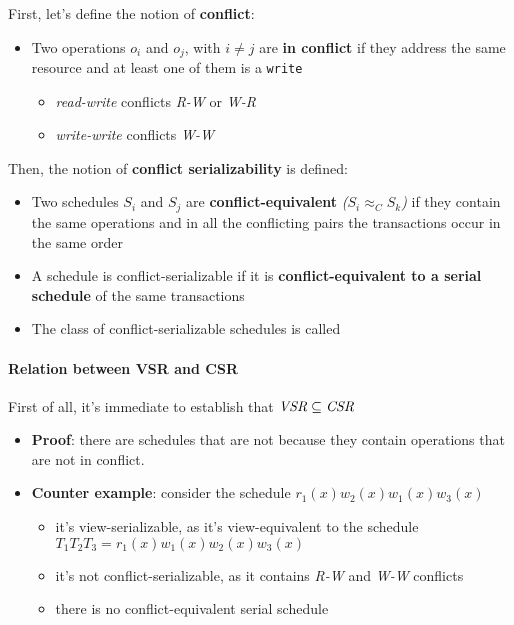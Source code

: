 \documentclass[english]{article}
\begin{document}
First, let's define the notion of \textbf{conflict}:

\begin{itemize}
  \item Two operations \(o_i\) and \(o_j\), with \(i \neq j\) are \textbf{in conflict} if they address the same resource and at least one of them is a \texttt{write}
        \begin{itemize}
          \item \textit{read-write} conflicts \textit{R-W} or \textit{W-R}
          \item \textit{write-write} conflicts \textit{W-W}
        \end{itemize}
\end{itemize}

Then, the notion of \textbf{conflict serializability} is defined:

\begin{itemize}
  \item Two schedules \(S_i\) and \(S_j\) are \textbf{conflict-equivalent} \textit{(\(S_i \approx_C S_k\))} if they contain the same operations and in all the conflicting pairs the transactions occur in the same order
  \item A schedule is conflict-serializable if it is \textbf{conflict-equivalent to a serial schedule} of the same transactions
  \item The class of conflict-serializable schedules is called \CSR
\end{itemize}

\paragraph{Relation between VSR and CSR}

First of all, it's immediate to establish that \(\textit{VSR} \subseteq \textit{CSR}\)

\begin{itemize}
  \item \textbf{Proof}: there are \VSR schedules that are not \CSR because they contain operations that are not in conflict.
  \item \textbf{Counter example}: consider the schedule \(r_1(x) w_2(x) w_1(x) w_3(x)\)
        \begin{itemize}
          \item it's view-serializable, as it's view-equivalent to the schedule \(T_1 T_2 T_3 = r_1(x) w_1(x) w_2(x) w_3(x)\)
          \item it's not conflict-serializable, as it contains \textit{R-W} and \textit{W-W} conflicts
          \item there is no conflict-equivalent serial schedule
        \end{itemize}
\end{itemize}
\end{document}
